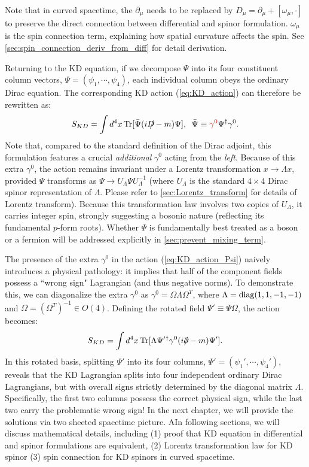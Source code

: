 Note that in curved spacetime, the $\partial_\mu$ needs to be replaced by $D_\mu=\partial_\mu+[\omega_\mu,\cdot]$ to preserve the direct connection between differential and spinor formulation. $\omega_\mu$ is the spin connection term, explaining how spatial curvature affects the spin. See \cref{sec:spin_connection_deriv_from_diff} for detail derivation.

Returning to the KD equation, if we decompose $\Psi$ into its four constituent column vectors, $\Psi=(\psi_1,\cdots,\psi_4)$, each individual column obeys the ordinary Dirac equation. The corresponding KD action (\ref{eq:KD_action}) can therefore be rewritten as:
\begin{equation}\label{eq:KD_action_Psi}
  S_{KD}=\int d^{4}x\,{\rm Tr}[\bar{\Psi}(iD\!\!\!\!\;\!/-m)\Psi],\;\;\bar{\Psi}\equiv \textcolor{red}{\gamma^{0}}\Psi^{\dagger}\gamma^{0}.
\end{equation}
Note that, compared to the standard definition of the Dirac adjoint, this formulation features a crucial {\it additional} $\gamma^{0}$ acting from the {\it left}. Because of this extra $\gamma^{0}$, the action remains invariant under a Lorentz transformation $x\to \Lambda x$, provided $\Psi$ transforms as $\Psi\to U_{\Lambda}^{}\Psi U_{\Lambda}^{-1}$ (where $U_{\Lambda}$ is the standard $4\times4$ Dirac spinor representation of $\Lambda$. Please refer to \cref{sec:Lorentz_transform} for details of Lorentz transform). Because this transformation law involves two copies of $U_{\Lambda}$, it carries integer spin, strongly suggesting a bosonic nature (reflecting its fundamental $p$-form roots). Whether $\Psi$ is fundamentally best treated as a boson or a fermion will be addressed explicitly in \cref{sec:prevent_mixing_term}.

The presence of the extra $\gamma^{0}$ in the action (\ref{eq:KD_action_Psi}) naively introduces a physical pathology: it implies that half of the component fields possess a ``wrong sign" Lagrangian (and thus negative norms). To demonstrate this, we can diagonalize the extra $\gamma^{0}$ as $\gamma^{0}=\Omega\Lambda\Omega^{T}$, where $\Lambda={\rm diag}(1,1,-1,-1)$ and $\Omega=(\Omega^{T})^{-1}\in O(4)$. Defining the rotated field $\Psi'\equiv\Psi\Omega$, the action becomes:
\begin{equation}
  \label{eq:S_KD_Lorentzian1p}
  S_{KD}=\int d^{4}x\,{\rm Tr}[\Lambda\Psi'{}^{\dagger}\gamma^{0}(i\partial\!\!\!\!\;\!/-m)\Psi'].
\end{equation}
In this rotated basis, splitting $\Psi'$ into its four columns, $\Psi'=(\psi_1',\cdots,\psi_4')$, reveals that the KD Lagrangian splits into four independent ordinary Dirac Lagrangians, but with overall signs strictly determined by the diagonal matrix $\Lambda$. Specifically, the first two columns possess the correct physical sign, while the last two carry the problematic wrong sign! In the next chapter, we will provide the solutions via two sheeted spacetime picture.
AIn following sections, we will discuss mathematical details, including (1) proof that KD equation in differential and spinor formulations are equivalent, (2) Lorentz transformation law for KD spinor (3) spin connection for KD spinors in curved spacetime.

